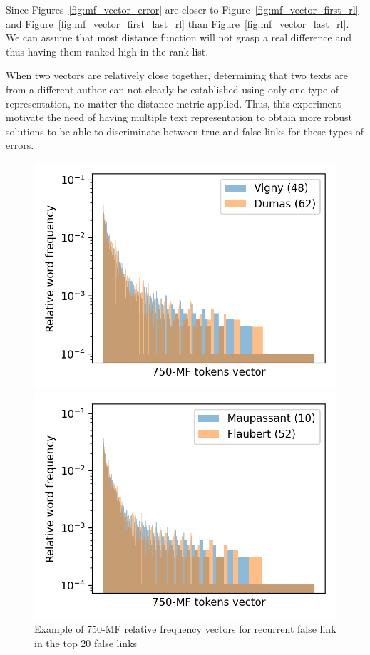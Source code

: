 Since Figures~\ref{fig:mf_vector_error} are closer to Figure~\ref{fig:mf_vector_first_rl} and Figure~\ref{fig:mf_vector_first_last_rl} than Figure~\ref{fig:mf_vector_last_rl}.
We can assume that most distance function will not grasp a real difference and thus having them ranked high in the rank list.

When two vectors are relatively close together, determining that two texts are from a different author can not clearly be established using only one type of representation, no matter the distance metric applied.
Thus, this experiment motivate the need of having multiple text representation to obtain more robust solutions to be able to discriminate between true and false links for these types of errors.

\begin{figure}
  \centering
  \caption{Example of 750-MF relative frequency vectors for recurrent false link in the top 20 false links}
  \label{fig:mf_vector_error}

  \label{fig:mf_vector_error_0}
  \includegraphics[width=\linewidth]{img/mf_vector_error_0.png}

  \vspace{0.5cm}

  \label{fig:mf_vector_error_1}
  \includegraphics[width=\linewidth]{img/mf_vector_error_1.png}
\end{figure}

